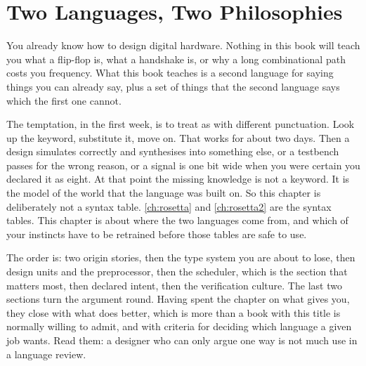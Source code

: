 \chapter{Two Languages, Two Philosophies}
\label{ch:philosophy}



You already know how to design digital hardware. Nothing in this book will
teach you what a flip-flop is, what a handshake is, or why a long combinational
path costs you frequency. What this book teaches is a second language for
saying things you can already say, plus a set of things that the second
language says which the first one cannot.

The temptation, in the first week, is to treat \SV{} as \VHDL{} with different
punctuation. Look up the keyword, substitute it, move on. That works for about
two days. Then a design simulates correctly and synthesises into something
else, or a testbench passes for the wrong reason, or a signal is one bit wide
when you were certain you declared it as eight. At that point the missing
knowledge is not a keyword. It is the model of the world that the language was
built on. So this chapter is deliberately not a syntax table.
\cref{ch:rosetta} and \cref{ch:rosetta2} are the syntax tables. This chapter
is about where the two languages come from, and which of your instincts have
to be retrained before those tables are safe to use.

The order is: two origin stories, then the type system you are about to lose,
then design units and the preprocessor, then the scheduler, which is the
section that matters most, then declared intent, then the verification culture.
The last two sections turn the argument round. Having spent the chapter on
what \SV{} gives you, they close with what \VHDL{} does better, which is more
than a book with this title is normally willing to admit, and with criteria
for deciding which language a given job wants. Read them: a designer who can
only argue one way is not much use in a language review.

